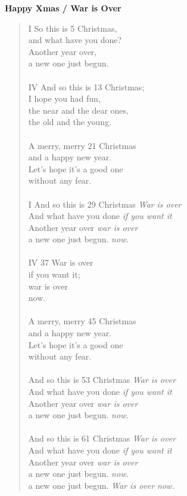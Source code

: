 \documentclass[10pt]{article}
\begin{document}
\textbf{Happy Xmas / War is Over}

\begin{verse}
    {\tiny I} So this is {\tiny 5} Christmas, \\
    and what have you done? \\
    Another year over, \\
    a new one just begun. \\
    \ \\

    {\tiny IV} And so this is {\tiny 13} Christmas; \\
    I hope you had fun, \\
    the near and the dear ones, \\
    the old and the young. \\
    \ \\

    A merry, merry {\tiny 21} Christmas \\
    and a happy new year. \\
    Let's hope it's a good one \\
    without any fear. \\
    \ \\

    {\tiny I} And so this is {\tiny 29} Christmas {\it War is over} \\
    And what have you done {\it if you want it} \\
    Another year over {\it war is over} \\
    a new one just begun. {\it now. } \\
    \ \\

    {\tiny IV 37} War is over \\
    if you want it; \\
    war is over \\
    now. \\
    \ \\

    A merry, merry {\tiny 45} Christmas \\
    and a happy new year. \\
    Let's hope it's a good one \\
    without any fear. \\
    \ \\

    And so this is {\tiny 53} Christmas {\it War is over} \\
    And what have you done {\it if you want it} \\
    Another year over {\it war is over} \\
    a new one just begun. {\it now. } \\
    \ \\

    And so this is {\tiny 61} Christmas {\it War is over} \\
    And what have you done {\it if you want it} \\
    Another year over {\it war is over} \\
    a new one just begun. {\it now. } \\
    a new one just begun. {\it War is over now. } \\

\end{verse}
\end{document}
